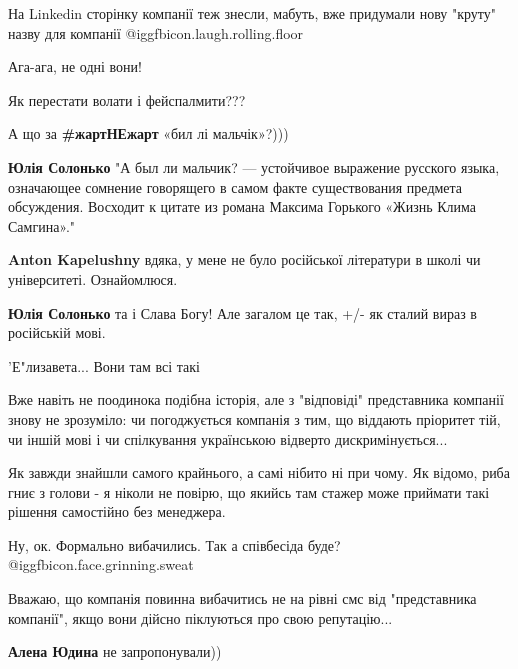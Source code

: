 \begin{itemize}
На Linkedin сторінку компанії теж знесли, мабуть, вже придумали нову "круту" назву для компанії  @igg{fbicon.laugh.rolling.floor} 

Ага-ага, не одні вони!

Як перестати волати і фейспалмити???

А що за \textbf{\#жартНЕжарт} «бил лі мальчік»?)))

\begin{itemize} %
\textbf{Юлія Солонько} "А был ли мальчик? — устойчивое выражение русского языка, означающее сомнение говорящего в самом факте существования предмета обсуждения. Восходит к цитате из романа Максима Горького «Жизнь Клима Самгина»."

\textbf{Anton Kapelushny} вдяка, у мене не було російської літератури в школі чи університеті. Ознайомлюся.

\textbf{Юлія Солонько} та і Слава Богу! Але загалом це так, +/- як сталий вираз в російській мові.
\end{itemize} %

'Е"лизавета... Вони там всі такі


Вже навіть не поодинока подібна історія, але з "відповіді" представника
компанії знову не зрозуміло: чи погоджується компанія з тим, що віддають
пріоритет тій, чи іншій мові і чи спілкування українською відверто
дискримінується...


Як завжди знайшли самого крайнього, а самі нібито ні при чому. Як відомо, риба
гниє з голови - я ніколи не повірю, що якийсь там стажер може приймати такі
рішення самостійно без менеджера.

Ну, ок. Формально вибачились. Так а співбесіда буде? @igg{fbicon.face.grinning.sweat} 

Вважаю, що компанія повинна вибачитись не на рівні смс від "представника компанії", якщо вони дійсно піклуються про свою репутацію...

\textbf{Алена Юдина} не запропонували))

\end{itemize} %
